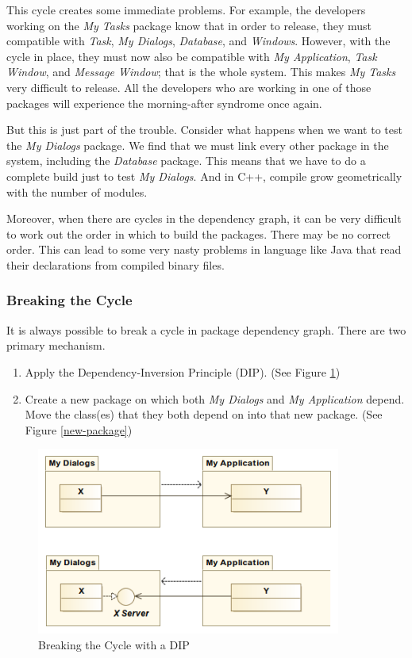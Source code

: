 \documentclass[12pt]{report}
\begin{document}
This cycle creates some immediate problems.
For example, the developers working on the \textit{My Tasks}
package know that in order to release, they must compatible with 
\textit{Task}, \textit{My Dialogs}, \textit{Database}, and 
\textit{Windows}. However, with the cycle in place, they must now also be 
compatible with \textit{My Application}, \textit{Task Window}, and 
\textit{Message Window}; that is the whole system.
This makes \textit{My Tasks} very difficult to release. 
All the developers who are working in one of those packages will 
experience the morning-after syndrome once again.

But this is just part of the trouble. Consider what happens when we want to test the \textit{My Dialogs} package. We find that we must link every other package in the system, including the \textit{Database} package.
This means that we have to do a complete build just to test 
\textit{My Dialogs}.
And in C++, compile grow geometrically with the number of modules.

Moreover, when there are cycles in the dependency graph, it can be very
difficult to work out the order in which to build the packages. There may be
no correct order.
This can lead to some very nasty problems in language like 
Java that read their declarations from compiled binary files.

\subsubsection{Breaking the Cycle}
It is always possible to break a cycle in package dependency graph.
There are two primary mechanism.

\begin{enumerate}
    \item Apply the Dependency-Inversion Principle (DIP). 
        (See Figure \ref{DIP})
    \item Create a new package on which both \textit{My Dialogs} and 
        \textit{My Application} depend. Move the class(es) that they 
        both depend on into that new package. 
        (See Figure \ref{new-package})
\end{enumerate}

\begin{figure}[H]
    \centering
    \includegraphics[width=10cm]{uml/DIP.png}
    \caption{Breaking the Cycle with a DIP}
    \label{DIP}
\end{figure}
\end{document}
